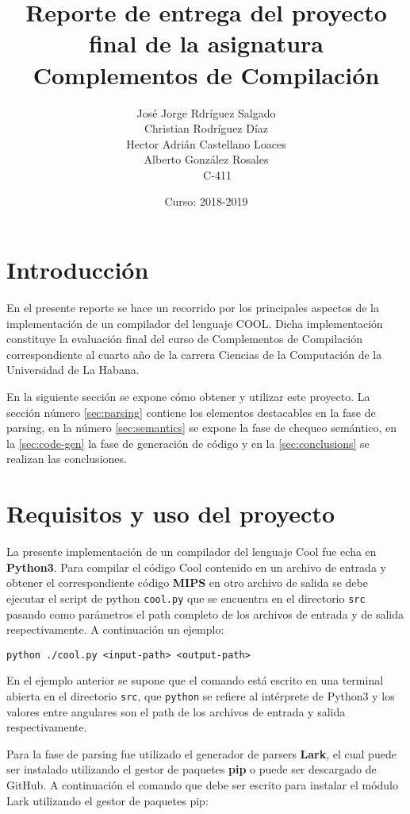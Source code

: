 \documentclass{article}
\author{Jos\'e Jorge Rdr\'{i}guez Salgado \\
	Christian Rodr\'{i}guez D\'{i}az \\
	Hector Adri\'an Castellano Loaces \\
	Alberto Gonz\'alez Rosales \\
	\ \ \ \ C-411}
\date{Curso: 2018-2019}
\title{Reporte de entrega del proyecto final de la asignatura Complementos de Compilaci\'on}
\begin{document}
	\maketitle
	
	\section{Introducci\'on}
	
	En el presente reporte se hace un recorrido por los principales aspectos de la implementaci\'on de un compilador del lenguaje COOL. Dicha implementaci\'on constituye la evaluaci\'on
	final del curso de Complementos de Compilaci\'on correspondiente al cuarto a\~no de la carrera Ciencias de la Computaci\'on de la Universidad de La Habana.
	
	En la siguiente secci\'on se expone c\'omo obtener y utilizar este proyecto. La secci\'on n\'umero \ref{sec:parsing} contiene los elementos destacables en la fase de parsing, en la n\'umero \ref{sec:semantics} se expone la fase de chequeo sem\'antico, en la \ref{sec:code-gen} la fase de generaci\'on de c\'odigo y en la \ref{sec:conclusions} se realizan las conclusiones.
	
	\section{Requisitos y uso del proyecto}
	
	La presente implementaci\'on de un compilador del lenguaje Cool fue echa en \textbf{Python3}. Para compilar el c\'odigo Cool contenido en un archivo de 
	entrada y obtener el correspondiente c\'odigo \textbf{MIPS} en otro archivo de salida se debe ejecutar el script de python \texttt{cool.py} que se encuentra en
	el directorio \texttt{src} pasando como par\'ametros el path completo de los archivos de entrada y de salida respectivamente. A continuaci\'on un ejemplo:
	
	\begin{center}
		\texttt{python ./cool.py <input-path> <output-path>}
	\end{center}

	
	En el ejemplo anterior se supone que el comando est\'a escrito en una terminal abierta en el directorio \texttt{src}, que \texttt{python} se refiere al 
	int\'erprete de Python3 y los valores entre angulares son el path de los archivos de entrada y salida respectivamente.
	
	Para la fase de parsing fue utilizado el generador de parsers \textbf{Lark}, el cual puede ser instalado utilizando el gestor de paquetes \textbf{pip} o puede 
	ser descargado de GitHub. A continuaci\'on el comando que debe ser escrito para instalar el m\'odulo Lark utilizando el gestor de paquetes pip:
	
\end{document}
